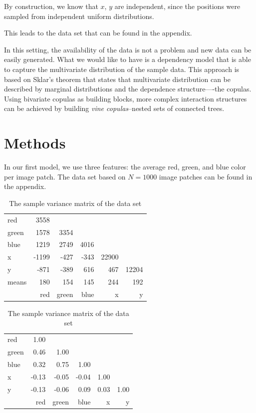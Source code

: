 \documentclass{article}
\begin{document}
By construction, we know that $x$, $y$ are independent, since the
positions were sampled from independent uniform distributions.

This leads to the data set that can be found in the appendix.



In this setting, the availability of the data is not a problem and new
data can be easily generated. What we would like to have is a
dependency model that is able to capture the multivariate distribution
of the sample data. This approach is based on Sklar's theorem that
states that multivariate distribution can be described by marginal
distributions and the dependence structure----the copulas. Using
bivariate copulas as building blocks, more complex interaction
structures can be achieved by building \emph{vine copulas}--nested
sets of connected trees.

\section{Methods}

In our first model, we use three features: the average red, green, and
blue color per image patch. The data set based on $N = 1000$ image
patches can be found in the appendix.

\begin{table}[h]
  \centering
  \begin{tabular}{l|rrrrr}
    red   & 3558  &       &      &       &       \\
    green & 1578  & 3354  &      &       &       \\
    blue  & 1219  & 2749  & 4016 &       &       \\
    x     & -1199 & -427  & -343 & 22900 &       \\
    y     & -871  & -389  & 616  & 467   & 12204 \\
    \midrule
    means & 180   & 154   & 145  & 244   & 192   \\
    \midrule
          & red   & green & blue & x     & y
  \end{tabular}
  \caption{The sample variance matrix of the data set}
\end{table}

\begin{table}[h]
  \centering
  \begin{tabular}{l|rrrrr}
    red   & 1.00  &       &       &      &      \\
    green & 0.46  & 1.00  &       &      &      \\
    blue  & 0.32  & 0.75  & 1.00  &      &      \\
    x     & -0.13 & -0.05 & -0.04 & 1.00 &      \\
    y     & -0.13 & -0.06 & 0.09  & 0.03 & 1.00 \\
    \midrule
          & red   & green & blue  & x    & y
  \end{tabular}
  \caption{The sample variance matrix of the data set}
\end{table}
\end{document}
